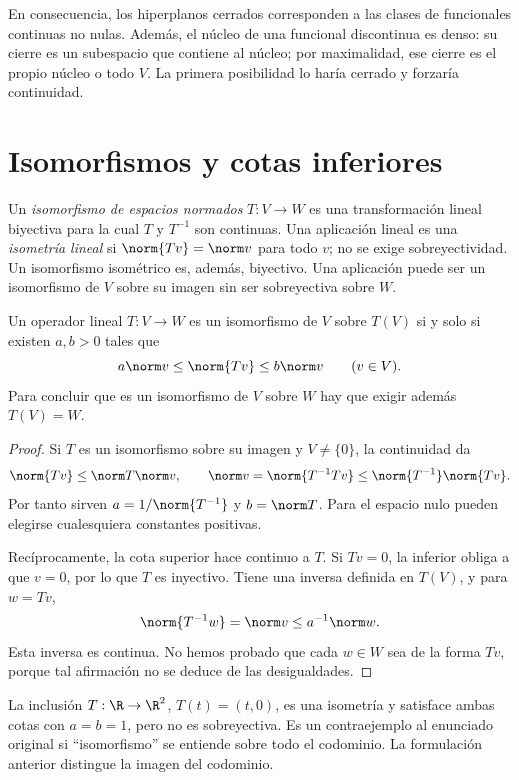 En consecuencia, los hiperplanos cerrados corresponden a las clases de funcionales continuas no nulas. Además, el núcleo de una funcional discontinua es denso: su cierre es un subespacio que contiene al núcleo; por maximalidad, ese cierre es el propio núcleo o todo $V$. La primera posibilidad lo haría cerrado y forzaría continuidad.

\section{Isomorfismos y cotas inferiores}

\begin{definicion}
Un \emph{isomorfismo de espacios normados} $T:V\to W$ es una transformación lineal biyectiva para la cual $T$ y $T^{-1}$ son continuas. Una aplicación lineal es una \emph{isometría lineal} si $\norm{Tv}=\norm v$ para todo $v$; no se exige sobreyectividad. Un isomorfismo isométrico es, además, biyectivo. Una aplicación puede ser un isomorfismo de $V$ sobre su imagen sin ser sobreyectiva sobre $W$.
\end{definicion}

\begin{teorema}\label{ch21:cota-inferior}
Un operador lineal $T:V\to W$ es un isomorfismo de $V$ sobre $T(V)$ si y solo si existen $a,b>0$ tales que
\[
 a\norm v\leq\norm{Tv}\leq b\norm v\qquad(v\in V).
\]
Para concluir que es un isomorfismo de $V$ sobre $W$ hay que exigir además $T(V)=W$.
\end{teorema}
\begin{proof}
Si $T$ es un isomorfismo sobre su imagen y $V\ne\{0\}$, la continuidad da
\[
 \norm{Tv}\leq\norm T\norm v,
 \qquad\norm v=\norm{T^{-1}Tv}\leq\norm{T^{-1}}\norm{Tv}.
\]
Por tanto sirven $a=1/\norm{T^{-1}}$ y $b=\norm T$. Para el espacio nulo pueden elegirse cualesquiera constantes positivas.

Recíprocamente, la cota superior hace continuo a $T$. Si $Tv=0$, la inferior obliga a que $v=0$, por lo que $T$ es inyectivo. Tiene una inversa definida en $T(V)$, y para $w=Tv$,
\[
 \norm{T^{-1}w}=\norm v\leq a^{-1}\norm w.
\]
Esta inversa es continua. No hemos probado que cada $w\in W$ sea de la forma $Tv$, porque tal afirmación no se deduce de las desigualdades.
\end{proof}

\begin{observacion}
La inclusión $T:\R\to\R^2$, $T(t)=(t,0)$, es una isometría y satisface ambas cotas con $a=b=1$, pero no es sobreyectiva. Es un contraejemplo al enunciado original si ``isomorfismo'' se entiende sobre todo el codominio. La formulación anterior distingue la imagen del codominio.
\end{observacion}

